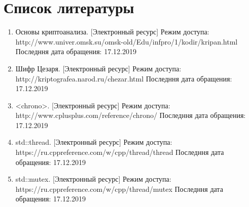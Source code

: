 \documentclass[12pt]{report}
\begin{document}
\chapter*{Список литературы}
\begin{enumerate}
	\item Основы криптоанализа. [Электронный ресурс] Режим доступа: http://www.univer.omsk.su/omsk-old/Edu/infpro/1/kodir/kripan.html 
	Последння дата обращения: 17.12.2019
	\item Шифр Цезаря. [Электронный ресурс] 
	Режим доступа: http://kriptografea.narod.ru/chezar.html Последння дата обращения: 17.12.2019
	\item <chrono>. [Электронный ресурс] 
	Режим доступа: http://www.cplusplus.com/reference/chrono/ Последння дата обращения: 17.12.2019
	\item std::thread. [Электронный ресурс] 
	Режим доступа: https://ru.cppreference.com/w/cpp/thread/thread Последння дата обращения: 17.12.2019
	\item std::mutex. [Электронный ресурс] 
	Режим доступа: https://ru.cppreference.com/w/cpp/thread/mutex Последння дата обращения: 17.12.2019
\end{enumerate}
\end{document}
